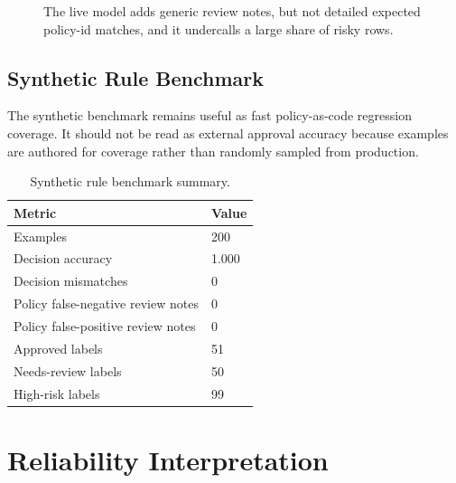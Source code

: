 \documentclass[10pt]{article}
\begin{document}
\begin{figure}[!htbp]
\centering
{}
\caption{The live model adds generic review notes, but not detailed expected
policy-id matches, and it undercalls a large share of risky rows.}
\label{fig:model-value}
\end{figure}

\subsection{Synthetic Rule Benchmark}

The synthetic benchmark remains useful as fast policy-as-code regression
coverage. It should not be read as external approval accuracy because examples
are authored for coverage rather than randomly sampled from production.

\begin{table}[!htbp]
\centering
\caption{Synthetic rule benchmark summary.}
\label{tab:rule-benchmark}
\small
\begin{tabularx}{0.78\linewidth}{@{}L R{1.6cm}@{}}
\toprule
\textbf{Metric} & \textbf{Value} \\
\midrule
Examples & 200 \\
Decision accuracy & 1.000 \\
Decision mismatches & 0 \\
Policy false-negative review notes & 0 \\
Policy false-positive review notes & 0 \\
Approved labels & 51 \\
Needs-review labels & 50 \\
High-risk labels & 99 \\
\bottomrule
\end{tabularx}
\end{table}

\section{Reliability Interpretation}
\end{document}
